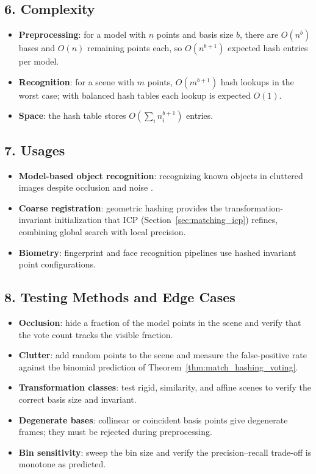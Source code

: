 \subsection{6. Complexity}

\begin{itemize}
\item \textbf{Preprocessing}: for a model with $n$ points and basis size
  $b$, there are $O(n^b)$ bases and $O(n)$ remaining points each, so
  $O(n^{b+1})$ expected hash entries per model.
\item \textbf{Recognition}: for a scene with $m$ points, $O(m^{b+1})$
  hash lookups in the worst case; with balanced hash tables each lookup is
  expected $O(1)$.
\item \textbf{Space}: the hash table stores $O(\sum_i n_i^{b+1})$ entries.
\end{itemize}

\subsection{7. Usages}

\begin{itemize}
\item \textbf{Model-based object recognition}: recognizing known objects in
  cluttered images despite occlusion and noise \cite{wolfson1997}.
\item \textbf{Coarse registration}: geometric hashing provides the
  transformation-invariant initialization that ICP
  (Section~\ref{sec:matching_icp}) refines, combining global search with
  local precision.
\item \textbf{Biometry}: fingerprint and face recognition pipelines use
  hashed invariant point configurations.
\end{itemize}

\subsection{8. Testing Methods and Edge Cases}

\begin{itemize}
\item \textbf{Occlusion}: hide a fraction of the model points in the scene
  and verify that the vote count tracks the visible fraction.
\item \textbf{Clutter}: add random points to the scene and measure the
  false-positive rate against the binomial prediction of
  Theorem~\ref{thm:match_hashing_voting}.
\item \textbf{Transformation classes}: test rigid, similarity, and affine
  scenes to verify the correct basis size and invariant.
\item \textbf{Degenerate bases}: collinear or coincident basis points give
  degenerate frames; they must be rejected during preprocessing.
\item \textbf{Bin sensitivity}: sweep the bin size and verify the
  precision--recall trade-off is monotone as predicted.
\end{itemize}

